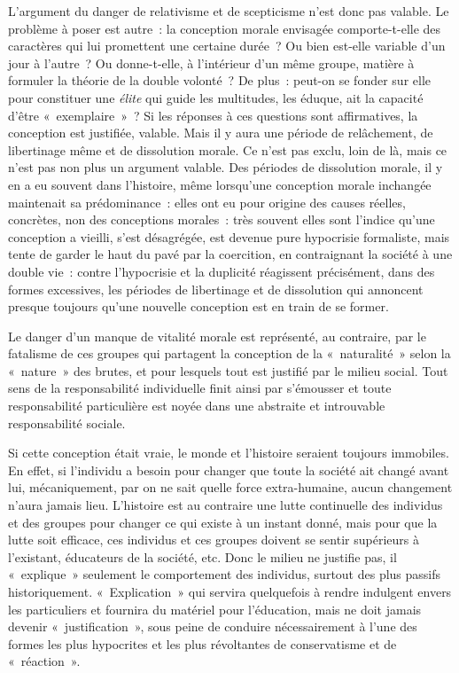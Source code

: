\documentclass[french,twoside]{book} %
\begin{document}
L'argument du danger de relativisme et de scepticisme n’est donc pas valable. Le problème à poser est autre : la conception morale envisagée comporte-t-elle des caractères qui lui promettent une certaine durée ? Ou bien est-elle variable d’un jour à l’autre ? Ou donne-t-elle, à l’intérieur d’un même groupe, matière à formuler la théorie de la double volonté ? De plus : peut-on se fonder sur elle pour constituer une \emph{élite} qui guide les multitudes, les éduque, ait la capacité d’être « exemplaire » ? Si les réponses à ces questions sont affirmatives, la conception est justifiée, valable. Mais il y aura une période de relâchement, de libertinage même et de dissolution morale. Ce n’est pas exclu, loin de là, mais ce n’est pas non plus un argument valable. Des périodes de dissolution morale, il y en a eu souvent dans l’histoire, même lorsqu’une conception morale inchangée maintenait sa prédominance : elles ont eu pour origine des causes réelles, concrètes, non des conceptions morales : très souvent elles sont l’indice qu’une conception a vieilli, s’est désagrégée, est devenue pure hypocrisie formaliste, mais tente de garder le haut du pavé par la coercition, en contraignant la société à une double vie : contre l’hypocrisie et la duplicité réagissent précisément, dans des formes excessives, les périodes de libertinage et de dissolution qui annoncent presque toujours qu’une nouvelle conception est en train de se former.\par
Le danger d’un manque de vitalité morale est représenté, au contraire, par le fatalisme de ces groupes qui partagent la conception de la « naturalité » selon la « nature » des brutes, et pour lesquels tout est justifié par le milieu social. Tout sens de la responsabilité individuelle finit ainsi par s’émousser et toute responsabilité particulière est noyée dans une abstraite et introuvable responsabilité sociale.\par
Si cette conception était vraie, le monde et l’histoire seraient toujours immobiles. En effet, si l’individu a besoin pour changer que toute la société ait changé avant lui, mécaniquement, par on ne sait quelle force extra-humaine, aucun changement n’aura jamais lieu. L'histoire est au contraire une lutte continuelle des individus et des groupes pour changer ce qui existe à un instant donné, mais pour que la lutte soit efficace, ces individus et ces groupes doivent se sentir supérieurs à l’existant, éducateurs de la société, etc. Donc le milieu ne justifie pas, il « explique » seulement le comportement des individus, surtout des plus passifs historiquement. « Explication » qui servira quelquefois à rendre indulgent envers les particuliers et fournira du matériel pour l’éducation, mais ne doit jamais devenir « justification », sous peine de conduire nécessairement à l’une des formes les plus hypocrites et les plus révoltantes de conservatisme et de « réaction ».\par
\end{document}
